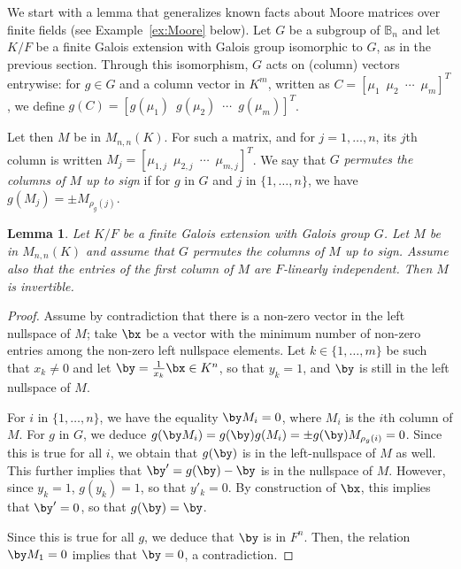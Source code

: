 \documentclass[12pt]{article}
\theoremstyle{plain}
\newtheorem{lemma}[theorem]{Lemma}
\begin{document}
We start with a lemma that generalizes known facts about Moore
matrices over finite fields (see Example~\ref{ex:Moore} below). Let
$G$ be a subgroup of $\mathbb{B}_n$ and let $K/F$ be a finite Galois
extension with Galois group isomorphic to $G$, as in the previous
section. Through this isomorphism, $G$ acts on (column) vectors
entrywise: for $g \in G$ and a column vector in $K^m$, written as $C =
\left[\mu_{1} \,\,\, \mu_{2} \,\,\, \cdots \,\,\, \mu_{m}\right]^T$,
we define $g(C) = \left[g(\mu_{1}) \,\,\, g(\mu_{2}) \,\,\, \cdots
  \,\,\, g(\mu_{m})\right]^T$.

Let then $M$ be in $M_{n,n}(K)$. For such a matrix, and for
$j=1,\dots,n$, its $j$th column is written $M_j=\left[\mu_{1,j} \,\,\,
  \mu_{2,j} \,\,\, \cdots \,\,\, \mu_{m,j}\right]^T$.  We say that $G$
{\em permutes the columns of $M$ up to sign} if for $g$ in $G$ and $j$
in $\{1,\dots,n\}$, we have $g(M_j)= \pm M_{\rho_g(j)}$.
 
\begin{lemma}\label{signdet}
   Let $K/F$ be a finite Galois extension with Galois group $G$. Let
   $M$ be in $M_{n,n}(K)$ and assume that $G$ permutes the columns of
   $M$ up to sign. Assume also that the entries of the first column
 of $M$ are $F$-linearly independent. Then $M$ is invertible.
\end{lemma}
\begin{proof}
  Assume by contradiction that there is a non-zero vector in the left
  nullspace of $M$; take $\bx$ be a vector with the minimum number of
  non-zero entries among the non-zero left nullspace elements.
  Let $k \in \{1,\dots,m\}$ be such that $x_k \neq 0$ and let
  $\by=\frac 1{x_k} \bx \in K^n$, so that $y_k = 1$, and $\by$ is
  still in the left nullspace of $M$. 
  
  For $i$ in $\{1,\dots,n\}$, we have the equality $\by M_i = 0 $,
  where $M_i$ is the $i$th column of $M$. For $g$ in $G$, we deduce
  $g(\by M_i) = g(\by)g(M_i) = \pm g(\by) M_{\rho_g(i)} = 0$. Since
  this is true for all $i$, we obtain that $g(\by)$ is in the
  left-nullspace of $M$ as well. This further implies that
  $\by'=g(\by)-\by$ is in the nullspace of $M$. However, since
  $y_k=1$, $g(y_k)=1$, so that $y'_k=0$. By construction of $\bx$, this
  implies that $\by'=0$, so that $g(\by)=\by$. 

  Since this is true for all $g$, we deduce that $\by$ is in $F^n$.
  Then, the relation $\by M_1=0$ implies that $\by=0$, a
  contradiction.
 \end{proof} 
\end{document}
